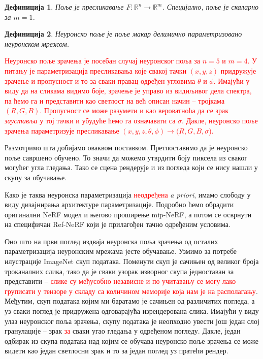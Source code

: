 \documentclass[12pt, a4paper, twoside]{book}
\numberwithin{equation}{chapter}
\numberwithin{theorem}{section}
\numberwithin{definition}{section}
\newtheorem{definitionChapter}{Дефиниција}
\numberwithin{definitionChapter}{chapter}
\begin{document}
	\begin{definitionChapter}
		Поље је пресликавање $F:\mathbb{R}^n \rightarrow \mathbb{R}^m$. Специјално, поље је скаларно
		за $m=1$.
	\end{definitionChapter}

	\begin{definitionChapter}
		Неуронско поље је поље макар делимично параметризовано неуронском мрежом.
	\end{definitionChapter}

	\textcolor{red}{Неуронско поље зрачења је посебан случај неуронског поља за $n=5$ и $m=4$. У питању је
	параметризација пресликавања које свакој тачки $(x, y, z)$ придружује зрачење и пропусност и то за сваки правац
	одређен угловима $\theta$ и $\phi$. Имајући у виду да на сликама видимо боје, зрачење је управо из
	видиљивог дела спектра, па ћемо га и представити као светлост на већ описан начин -- тројкама $(R, G, B)$.
	Пропусност се може разумети и као вероватноћа да се зрак \textit{зауставља} у тој тачки и убудуће ћемо га означавати
	са $\sigma$. Дакле, неуронско поље зрачења параметризује пресликавање $(x, y, z, \theta, \phi) \rightarrow (R, G, B, \sigma$).}
	
	Размотримо шта добијамо оваквом поставком. Претпоставимо да је неуронско поље савршено обучено. То значи
	да можемо утврдити боју пиксела из сваког могућег угла гледања. Тако се сцена рендерује и из погледа
	који се нису нашли у скупу за обучавање.

	Како је таква неуронска параметризација \textcolor{red}{неодређена} \textit{a priori}, имамо слободу у виду
	дизајнирања архитектуре параметризације. Подробно ћемо обрадити оригинални NeRF модел и његово проширење mip-NeRF, а
	потом се осврнути на специфичан Ref-NeRF који је прилагођен тачно одређеним условима.
	
	Оно што на први поглед издваја неуронска поља зрачења од осталих параметризација неуронским мрежама јесте
	обучавање. Узмимо за потребе илустрације ImageNet \cite{imagenet} скуп података. Поменути скуп је сачињен
	од великог броја троканалних слика, тако да је сваки узорак изворног скупа једноставан за представити
	-- \textcolor{red}{слике су међусобно независне и по учитавању се могу лако груписати у тензоре у складу
	са количином меморије која нам је на располагању}.
	Међутим, скуп података којим ми баратамо је сачињен од различитих погледа, а уз сваки поглед је придружена
	одговарајућа изрендерована слика. Имајући у виду улаз неуронског поља зрачења, скупу података је неопходно
	увести још један слој гранулације -- зрак \textcolor{red}{за} сваки угао гледања у одређеном погледу. Дакле,
	један одбирак из скупа података над којим се обучава неуронско поље зрачења се може видети као један светлосни
	зрак и то за један поглед уз пратећи рендер.
\end{document}

